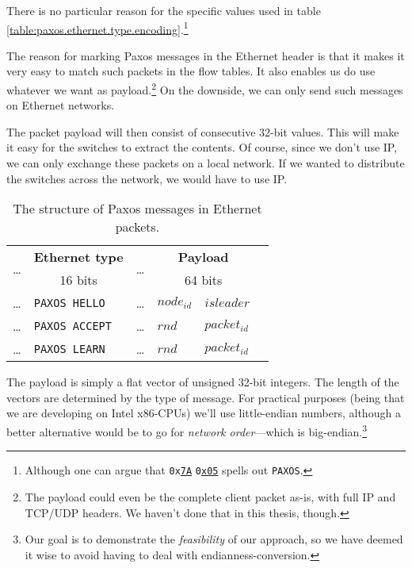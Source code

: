 There is no particular reason for the specific values used in table
\ref{table:paxos.ethernet.type.encoding}.\footnote{Although one can argue
that \texttt{0x\underline{7A}} \texttt{0\underline{x05}} spells out \texttt{PAXOS}.}

The reason for marking Paxos messages in the Ethernet header is that it
makes it very easy to match such packets in the flow tables.  It also
enables us do use whatever we want as payload.\footnote{The payload could
even be the complete client packet as-is, with full IP and TCP/UDP
headers.  We haven't done that in this thesis, though.} On the downside,
we can only send such messages on Ethernet networks.

The packet payload will then consist of consecutive 32-bit values.
This will make it easy for the switches to extract the contents.
Of course, since we don't use IP, we can only exchange these packets on a
local network.  If we wanted to distribute the switches across the network,
we would have to use IP.

\begin{table}[H]
  \centering
  \begin{tabular}{l|l|l|l|l|l|}
    \hline
      \multirow{2}{*}{\dots} &
      \multicolumn{1}{c|}{\textbf{Ethernet type}} &
      \multirow{2}{*}{\dots} &
      \multicolumn{2}{c|}{\textbf{Payload}} \\

      &
      \multicolumn{1}{c|}{16 bits} &
      &
      \multicolumn{2}{c|}{64 bits} \\

    \hline
      \dots & \texttt{PAXOS HELLO}  &
      \dots & $node_{id}$ & $isleader$ \\

    \hline
      \dots & \texttt{PAXOS ACCEPT} &
      \dots & $rnd$ & $packet_{id}$ \\

    \hline
      \dots & \texttt{PAXOS LEARN} &
      \dots & $rnd$ & $packet_{id}$ \\

    \hline
  \end{tabular}

  \caption{The structure of Paxos messages in Ethernet packets.}
  \label{table:paxos.ethernet.packet}
\end{table}

The payload is simply a flat vector of unsigned 32-bit integers.  The length
of the vectors are determined by the type of message.  For practical
purposes (being that we are developing on Intel x86-CPUs) we'll use
little-endian numbers, although a better alternative would be to go for
\textit{network order}---which is big-endian.\footnote{Our goal is to
demonstrate the \textit{feasibility} of our approach, so we have deemed it
wise to avoid having to deal with endianness-conversion.}

